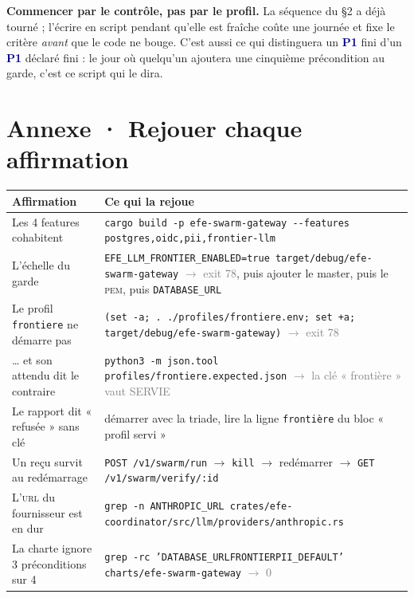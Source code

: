 \documentclass[10pt]{article}
\newcommand{\sz}[1]{\textcolor{grey}{\small\textsf{#1}}}
\newcommand{\code}[1]{\texttt{\small #1}}
\newcommand{\fl}{$\rightarrow$}
\newcommand{\mm}[1]{\textbf{\textcolor{navy}{#1}}}
\begin{document}
\begin{piste}
\textbf{Commencer par le contrôle, pas par le profil.} La séquence du \S2 a déjà tourné ; l'écrire
en script pendant qu'elle est fraîche coûte une journée et fixe le critère \emph{avant} que le code
ne bouge. C'est aussi ce qui distinguera un \mm{P1} fini d'un \mm{P1} déclaré fini : le jour où
quelqu'un ajoutera une cinquième précondition au garde, c'est ce script qui le dira.
\end{piste}

\section{Annexe · Rejouer chaque affirmation}

\renewcommand{\arraystretch}{1.22}
\begin{center}\small
\begin{tabular}{@{}>{\raggedright\arraybackslash}p{4.8cm} >{\raggedright\arraybackslash}p{11.2cm}@{}}
\toprule
\textbf{Affirmation} & \textbf{Ce qui la rejoue} \\
\midrule
Les 4 features cohabitent &
  \code{cargo build -p efe-swarm-gateway -{}-features postgres,oidc,pii,frontier-llm} \\
L'échelle du garde &
  \code{EFE\_LLM\_FRONTIER\_ENABLED=true target/debug/efe-swarm-gateway} \sz{\fl{} exit 78}, puis
  ajouter le master, puis le \textsc{pem}, puis \code{DATABASE\_URL} \\
Le profil \code{frontiere} ne démarre pas &
  \code{(set -a; . ./profiles/frontiere.env; set +a; target/debug/efe-swarm-gateway)} \sz{\fl{} exit 78} \\
\dots{} et son attendu dit le contraire &
  \code{python3 -m json.tool profiles/frontiere.expected.json} \sz{\fl{} la clé « frontière » vaut SERVIE} \\
Le rapport dit « refusée » sans clé &
  démarrer avec la triade, lire la ligne \code{frontière} du bloc « profil servi » \\
Un reçu survit au redémarrage &
  \code{POST /v1/swarm/run} \fl{} \code{kill} \fl{} redémarrer \fl{} \code{GET /v1/swarm/verify/:id} \\
L'\textsc{url} du fournisseur est en dur &
  \code{grep -n ANTHROPIC\_URL crates/efe-coordinator/src/llm/providers/anthropic.rs} \\
La charte ignore 3 préconditions sur 4 &
  \code{grep -rc 'DATABASE\_URL\textbar FRONTIER\textbar PII\_DEFAULT' charts/efe-swarm-gateway} \sz{\fl{} 0} \\
\bottomrule
\end{tabular}
\end{center}
\end{document}
